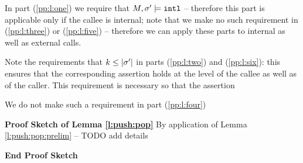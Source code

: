 {%
 
 In part  (\ref{pp:l:one}) we require that  $M, \sigma' \models \mbox{\normalfont{\texttt{intl}}}$ -- therefore this part is applicable only if the callee is internal; note that we make no such requirement   in (\ref{pp:l:three}) or (\ref{pp:l:five})  -- therefore we can 
 apply these parts to internal as well as external calls.
 
 Note the requirements that $k \leq |\sigma'|$ in parts (\ref{pp:l:two})  and (\ref{pp:l:six}): this ensures that the corresponding assertion holds at the level of the callee as well as of the caller. 
 This requirement is necessary so  that the assertion 
 
 We do  not make such a requirement in part  (\ref{pp:l:four})  
 
\noindent
\vspace{.1cm}
{\textbf{Proof Sketch  of Lemma \ref{l:push:pop}}}
By application of Lemma  \ref{l:push:pop:prelim} -- TODO add details

{\textbf{End Proof Sketch}} 


}
